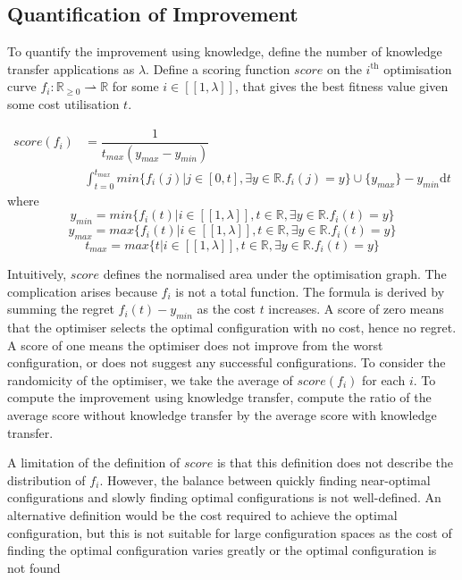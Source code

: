 \documentclass[10pt,a4paper]{article}
\newcommand{\dsb}[1]{[\![#1]\!]}
\begin{document}
\subsection{Quantification of Improvement}

To quantify the improvement using knowledge, define the number of knowledge transfer applications as $\lambda$. Define a scoring function $score$ on the $i^{\text{th}}$ optimisation curve $f_i:\mathbb{R}_{\ge 0}\rightharpoonup\mathbb{R}$ for some $i\in\dsb{1,\lambda}$, that gives the best fitness value given some cost utilisation $t$.

\[
	\begin{split}
		score(f_i)&=\dfrac{1}{t_{max}(y_{max}-y_{min})}\\
		&\int_{t=0}^{t_{max}}min\{f_i(j)|j\in[0,t],\exists y\in\mathbb{R}.f_i(j)=y\}\cup\{y_{max}\}-y_{min}\mathrm{d}t
	\end{split}
\]where
\[y_{min}=min\{f_i(t)|i\in\dsb{1,\lambda},t\in\mathbb{R},\exists y\in\mathbb{R}.f_i(t)=y\}\]
\[y_{max}=max\{f_i(t)|i\in\dsb{1,\lambda},t\in\mathbb{R},\exists y\in\mathbb{R}.f_i(t)=y\}\]
\[t_{max}=max\{t|i\in\dsb{1,\lambda},t\in\mathbb{R},\exists y\in\mathbb{R}.f_i(t)=y\}\]

Intuitively, $score$ defines the normalised area under the optimisation graph. The complication arises because $f_i$ is not a total function. The formula is derived by summing the regret $f_i(t)-y_{min}$ as the cost $t$ increases. A score of zero means that the optimiser selects the optimal configuration with no cost, hence no regret. A score of one means the optimiser does not improve from the worst configuration, or does not suggest any successful configurations. To consider the randomicity of the optimiser, we take the average of $score(f_i)$ for each $i$. To compute the improvement using knowledge transfer, compute the ratio of the average score without knowledge transfer by the average score with knowledge transfer.

A limitation of the definition of $score$ is that this definition does not describe the distribution of $f_i$. However, the balance between quickly finding near-optimal configurations and slowly finding optimal configurations is not well-defined. An alternative definition would be the cost required to achieve the optimal configuration, but this is not suitable for large configuration spaces as the cost of finding the optimal configuration varies greatly or the optimal configuration is not found
\end{document}
